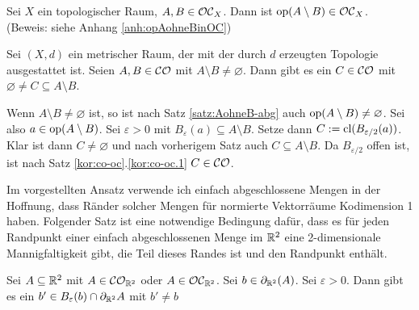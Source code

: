     
    \begin{satz}\label{satz:opAohneBinOC}
        Sei $X$ ein topologischer Raum, $A,B \in \mathcal{OC}_X$. Dann ist $\text{op}(A \setminus B) \in \mathcal{OC}_X$.\\
        (Beweis: siehe Anhang \ref{anh:opAohneBinOC})
    \end{satz}



    \begin{satz}
        Sei $(X,d)$ ein metrischer Raum, der mit der durch $d$ erzeugten Topologie ausgestattet ist. Seien $A,B \in \mathcal{CO}$ mit $A \setminus B \neq \varnothing$. Dann gibt es ein $C \in \mathcal{CO}$ mit $\varnothing \neq C \subseteq A \setminus B$.
    \end{satz}
    \begin{bew}
        Wenn $A \setminus B \neq \varnothing$ ist, so ist nach Satz \ref{satz:AohneB-abg} auch $\text{op}(A \setminus B) \neq \varnothing$. Sei also $a \in \text{op}(A \setminus B)$. Sei $\varepsilon > 0$ mit $B_\varepsilon(a) \subseteq A \setminus B$. Setze dann $C := \text{cl}(B_{\varepsilon / 2}(a))$. Klar ist dann $C \neq \varnothing$ und nach vorherigem Satz auch $C \subseteq A \setminus B$. Da $B_{\varepsilon / 2}$ offen ist, ist nach Satz \ref{kor:co-oc}.\ref{kor:co-oc.1} $C \in \mathcal{CO}$.
    \end{bew}


        Im
        vorgestellten Ansatz verwende ich einfach abgeschlossene Mengen in der Hoffnung, dass Ränder solcher Mengen für normierte Vektorräume Kodimension 1 haben. %
        Folgender Satz ist eine notwendige Bedingung dafür, dass es für jeden Randpunkt einer einfach abgeschlossenen Menge im $\mathbb{R}^2$ eine 2-dimensionale Mannigfaltigkeit gibt, die Teil dieses Randes ist und den Randpunkt enthält.

    \begin{satz}\label{satz:r2}
        Sei $A \subseteq \mathbb{R}^2$ mit $A \in \mathcal{CO}_{\mathbb{R}^2}$ oder $A \in \mathcal{OC}_{\mathbb{R}^2}$. Sei $b \in \partial_{\mathbb{R}^2}(A)$. Sei $\varepsilon > 0$. Dann gibt es ein $b' \in B_{\varepsilon}(b) \cap \partial_{\mathbb{R}^2} A$ mit $b' \neq b$
    \end{satz}


